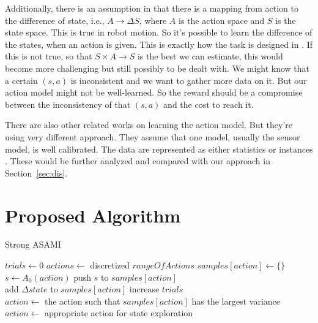 \documentclass[10pt]{article}
\begin{document}
Additionally, there is an assumption in \cite{CSJ06} that there is a
mapping from action to the difference of state, i.e., $A \rightarrow
\Delta S$, where $A$ is the action space and $S$ is the state space.  This
is true in robot motion. So it's possible to learn the difference of
the states, when an action is given. This is
exactly how the task is designed in \cite{ICDL10-hester}. If this is
not true, so that $S \times A \rightarrow S$ is the best we can
estimate, this would become more challenging but still possibly to be
dealt with. We might know that a certain $(s, a)$ is inconsistent and
we want to gather more data on it. But our action model might not be
well-learned. So the reward should be a compromise between the
inconsistency of that $(s, a)$ and the cost to reach it.

There are also other related works on learning the action model. But
they're using very different approach. They assume that one model,
usually the sensor model, is well calibrated. The data are represented
as either statistics \cite{And_learningand} or instances
\cite{LNAI2007-ahmadi}. These would be further analyzed and compared
with our approach in Section~\ref{sec:dis}.

\section{Proposed Algorithm}

\begin{algorithm*}
\caption{Strong ASAMI}\label{alg:asami}
\begin{algorithmic}[1]
    \State $trials\gets 0$
    \State $actions \gets$ discretized $rangeOfActions$
        \State $samples[action] \gets \{\}$ \label{asa:actInit}
        \State $s \gets A_0(action)$
	\State push $s$ to $samples[action]$
    \EndFor
\EndFunction
\\
 \label{asa:update}
    \State add $\Delta state$ to $samples[action]$
    \State increase $trials$
\EndFunction
\\
 \label{asa:getAct}
        \State $action \gets$ the action such that $samples[action]$ has the largest variance
    \Else
        \State $action \gets$ appropriate action for state exploration \label{asa:actSel2}
    \EndIf
\EndFunction
\end{algorithmic}
\end{algorithm*}
\end{document}
